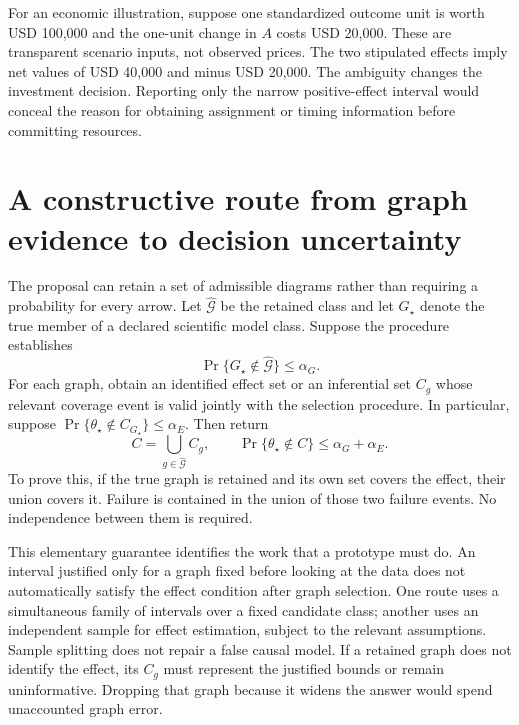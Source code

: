 For an economic illustration, suppose one standardized outcome unit is worth
USD 100,000 and the one-unit change in $A$ costs USD 20,000. These are
transparent scenario inputs, not observed prices. The two stipulated effects
imply net values of USD 40,000 and minus USD 20,000. The ambiguity changes
the investment decision. Reporting only the narrow positive-effect interval
would conceal the reason for obtaining assignment or timing information
before committing resources.

\section{A constructive route from graph evidence to decision uncertainty}

The proposal can retain a set of admissible diagrams rather than requiring a
probability for every arrow. Let $\widehat{\mathcal G}$ be the retained class
and let $G_\star$ denote the true member of a declared scientific model class.
Suppose the procedure establishes
\begin{equation}
 \Pr\{G_\star\notin\widehat{\mathcal G}\}\leq\alpha_G.
 \label{closure30:graph-retention-contract}
\end{equation}
For each graph, obtain an identified effect set or an inferential set
$C_g$ whose relevant coverage event is valid jointly with the selection
procedure. In particular, suppose
$\Pr\{\theta_\star\notin C_{G_\star}\}\leq\alpha_E$.
Then return
\begin{equation}
 C=\bigcup_{g\in\widehat{\mathcal G}} C_g,
 \qquad
 \Pr\{\theta_\star\notin C\}\leq\alpha_G+\alpha_E.
 \label{closure30:union-coverage}
\end{equation}
To prove this, if the true graph is retained and its own set covers the
effect, their union covers it. Failure is contained in the union of those
two failure events. No independence between them is required.

This elementary guarantee identifies the work that a prototype must do.
An interval justified only for a graph fixed before looking at the data
does not automatically satisfy the effect condition after graph selection.
One route uses a simultaneous family of intervals over a fixed candidate
class; another uses an independent sample for effect estimation, subject to
the relevant assumptions. Sample splitting does not repair a false causal
model. If a retained graph does not identify the effect, its $C_g$ must
represent the justified bounds or remain uninformative. Dropping that graph
because it widens the answer would spend unaccounted graph error.


